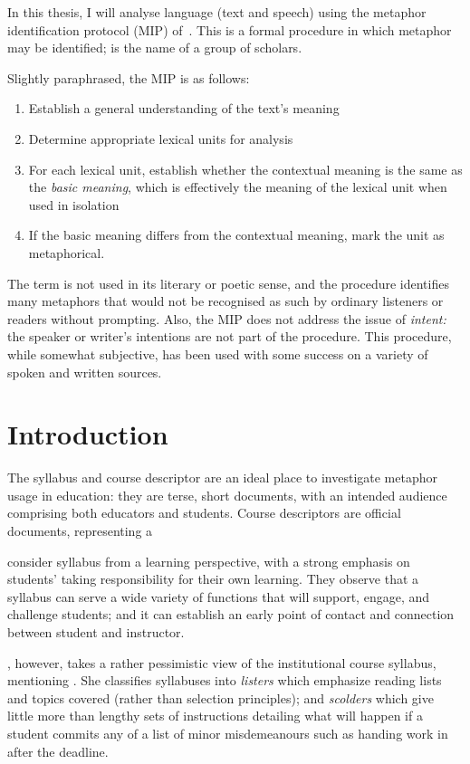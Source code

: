 In this thesis, I will analyse language (text and speech) using the
metaphor identification protocol (MIP) of~.
This is a formal procedure in which metaphor may be identified;
 is the name of a group of
scholars.

Slightly paraphrased, the MIP is as follows:
\begin{enumerate}
\item Establish a general understanding of the text's meaning
\item Determine appropriate lexical units for analysis
\item For each lexical unit, establish whether the contextual meaning
  is the same as the \emph{basic meaning}, which is effectively the
  meaning of the lexical unit when used in isolation
  \item If the basic meaning differs from the contextual meaning, mark
    the unit as metaphorical.
\end{enumerate}

The term  is not used in its literary or poetic
sense, and the procedure identifies many metaphors that would not be
recognised as such by ordinary listeners or readers without prompting.
Also, the MIP does not address the issue of \emph{intent:} the speaker
or writer's intentions are not part of the procedure.  This procedure,
while somewhat subjective, has been used with some success on a
variety of spoken and written sources.

\section{Introduction}

The syllabus and course descriptor are an ideal place to investigate
metaphor usage in education: they are terse, short documents, with an
intended audience comprising both educators and students.  Course
descriptors are official documents, representing a ~\parencite{luke2013}

 consider syllabus from a learning perspective, with
a strong emphasis on students' taking responsibility for their own
learning.  They observe that a syllabus can serve a wide variety of
functions that will support, engage, and challenge students; and it
can establish an early point of contact and connection between student
and instructor.

, however, takes a rather pessimistic view of the
institutional course syllabus, mentioning .  She classifies syllabuses into \emph{listers} which
emphasize reading lists and topics covered (rather than selection
principles); and \emph{scolders} which give little more than lengthy
sets of instructions detailing what will happen if a student commits
any of a list of minor misdemeanours such as handing work in after the
deadline.

